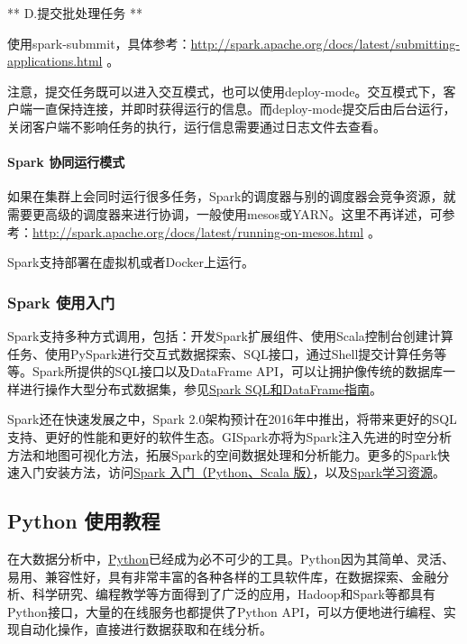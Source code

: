 \documentclass[letterpaper,10pt,english]{sphinxmanual}
\begin{document}
** D.提交批处理任务 **

使用spark-submmit，具体参考：\url{http://spark.apache.org/docs/latest/submitting-applications.html}
。

注意，提交任务既可以进入交互模式，也可以使用deploy-mode。交互模式下，客户端一直保持连接，并即时获得运行的信息。而deploy-mode提交后由后台运行，关闭客户端不影响任务的执行，运行信息需要通过日志文件去查看。


\paragraph{Spark 协同运行模式}
\label{gispark_paas:Spark-_u534f_u540c_u8fd0_u884c_u6a21_u5f0f}
如果在集群上会同时运行很多任务，Spark的调度器与别的调度器会竞争资源，就需要更高级的调度器来进行协调，一般使用mesos或YARN。这里不再详述，可参考：\url{http://spark.apache.org/docs/latest/running-on-mesos.html}
。

Spark支持部署在虚拟机或者Docker上运行。


\subsubsection{Spark 使用入门}
\label{gispark_paas:Spark-_u4f7f_u7528_u5165_u95e8}
Spark支持多种方式调用，包括：开发Spark扩展组件、使用Scala控制台创建计算任务、使用PySpark进行交互式数据探索、SQL接口，通过Shell提交计算任务等等。Spark所提供的SQL接口以及DataFrame
API，可以让拥护像传统的数据库一样进行操作大型分布式数据集，参见\href{http://my.oschina.net/u/2306127/blog/683685}{Spark
SQL和DataFrame指南}。

Spark还在快速发展之中，Spark
2.0架构预计在2016年中推出，将带来更好的SQL支持、更好的性能和更好的软件生态。GISpark亦将为Spark注入先进的时空分析方法和地图可视化方法，拓展Spark的空间数据处理和分析能力。更多的Spark快速入门安装方法，访问\href{http://my.oschina.net/u/2306127/blog/683680}{Spark
入门（Python、Scala
版）}，以及\href{http://my.oschina.net/u/2306127/blog/683687}{Spark学习资源}。


\subsection{Python 使用教程}
\label{gispark_paas:Python-_u4f7f_u7528_u6559_u7a0b}
在大数据分析中，\href{http://www.python.org}{Python}已经成为必不可少的工具。Python因为其简单、灵活、易用、兼容性好，具有非常丰富的各种各样的工具软件库，在数据探索、金融分析、科学研究、编程教学等方面得到了广泛的应用，Hadoop和Spark等都具有Python接口，大量的在线服务也都提供了Python
API，可以方便地进行编程、实现自动化操作，直接进行数据获取和在线分析。
\end{document}
